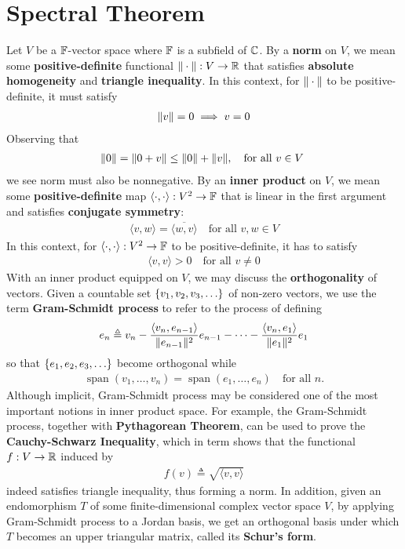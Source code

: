 \documentclass{report}
\begin{document}
\section{Spectral Theorem}
\label{Spectral Theorem}
Let  $V$ be a $\mathbb{F}$-vector space where $\mathbb{F}$ is a subfield of $\mathbb{C}$. By a \textbf{norm} on $V$, we mean some \textbf{positive-definite} functional $\| \cdot \|:V\to \mathbb{R}$ that satisfies \textbf{absolute homogeneity} and \textbf{triangle inequality}. In this context, for $\| \cdot \|$ to be positive-definite, it must satisfy 
\begin{align*}
  \| v \|=0 \implies  v=0
\end{align*}
Observing that  
\begin{align*}
\| 0 \|=\| 0+v \|\leq \| 0 \|+\| v \|,\quad \text{for all $v\in V$ }
\end{align*}
we see norm must also be nonnegative. By an \textbf{inner product} on $V$, we mean some \textbf{positive-definite}  map $\langle \cdot,\cdot\rangle : V^2 \rightarrow \mathbb{F}$ that is linear in the first argument and satisfies \textbf{conjugate symmetry}: 
\begin{align*}
\langle v,w\rangle = \overline{\langle w,v\rangle }\quad\text{for all }v,w \in V
\end{align*}
In this context, for $\langle \cdot,\cdot\rangle :V^2\rightarrow \mathbb{F}$ to be positive-definite, it has to satisfy 
\begin{align*}
\langle v,v\rangle >0\quad\text{for all }v\neq 0
\end{align*}
With an inner product equipped on $V$, we may discuss the  \textbf{orthogonality} of vectors. Given a countable set  $\set{v_1,v_2,v_3,\dots }$ of non-zero vectors, we use the term \textbf{Gram-Schmidt process} to refer to the process of defining 
\begin{align*}
e_n \triangleq v_n - \frac{\langle v_{n},e_{n-1}\rangle }{\| e_{n-1} \|^2}e_{n-1} - \cdots - \frac{\langle v_n,e_1\rangle }{\| e_1 \|^2}e_1
\end{align*}
so that $\set{e_1,e_2,e_3,\dots}$ become orthogonal while 
\begin{align*}
\operatorname{span}(v_1,\dots ,v_n)=\operatorname{span}(e_1,\dots ,e_n)\quad\text{for all }n.
\end{align*}
Although implicit, Gram-Schmidt process may be considered one of the most important notions in inner product space. For example, the Gram-Schmidt process, together with \textbf{Pythagorean Theorem}, can be used to prove the \textbf{Cauchy-Schwarz Inequality}, which in term shows that the functional $f:V\rightarrow \mathbb{R}$ induced by 
\begin{align*}
f(v)\triangleq \sqrt{\langle v,v\rangle }  
\end{align*}
indeed satisfies triangle inequality, thus forming a norm. In addition, given an endomorphism $T$ of some finite-dimensional complex vector space $V$, by applying Gram-Schmidt process to a Jordan basis, we get an orthogonal basis under which $T$ becomes an upper triangular matrix, called its \textbf{Schur's form}.\\
\end{document}
